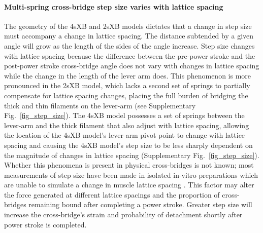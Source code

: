 \documentclass[]{article}
\begin{document}
\paragraph{Multi-spring cross-bridge step size varies with lattice spacing} %
The geometry of the 4sXB and 2sXB models dictates that a change in step size must accompany a change in lattice spacing. 
The distance subtended by a given angle will grow as the length of the sides of the angle increase. 
Step size changes with lattice spacing because the difference between the pre-power stroke and the post-power stroke cross-bridge angle does not vary with changes in lattice spacing while the change in the length of the lever arm does. 
This phenomenon is more pronounced in the 2sXB model, which lacks a second set of springs to partially compensate for lattice spacing changes, placing the full burden of bridging the thick and thin filaments on the lever-arm (see Supplementary Fig.~\ref{fig_step_size}). 
The 4sXB model possesses a set of springs between the lever-arm and the thick filament that also adjust with lattice spacing, allowing the location of the 4sXB model's lever-arm pivot point to change with lattice spacing and causing the 4sXB model's step size to be less sharply dependent on the magnitude of changes in lattice spacing (Supplementary Fig.~\ref{fig_step_size}).  
Whether this phenomena is present in physical cross-bridges is not known; most measurements of step size have been made in isolated in-vitro preparations which are unable to simulate a change in muscle lattice spacing \citep{HowardBook, Peterman2004}.  
This factor may alter the force generated at different lattice spacings and the proportion of cross-bridges remaining bound after completing a power stroke.
Greater step size will increase the cross-bridge's strain and probability of detachment shortly after power stroke is completed. 
\end{document}

